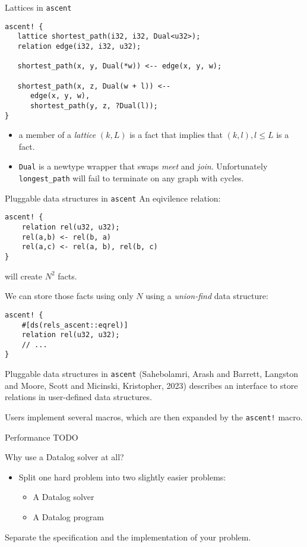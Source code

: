 \documentclass[presentation]{beamer}
\begin{document}
\begin{frame}[label={sec:orgaac534e},fragile]{Lattices in \texttt{ascent}}
 \begin{verbatim}
ascent! {
   lattice shortest_path(i32, i32, Dual<u32>);
   relation edge(i32, i32, u32);

   shortest_path(x, y, Dual(*w)) <-- edge(x, y, w);

   shortest_path(x, z, Dual(w + l)) <--
      edge(x, y, w),
      shortest_path(y, z, ?Dual(l));
}
\end{verbatim}

\begin{itemize}
\item a member of a \emph{lattice} \((k, L)\) is a fact that implies that \((k,l), l \leq L\) is a fact.
\item \texttt{Dual} is a newtype wrapper that swaps \emph{meet} and \emph{join}. Unfortunately \texttt{longest\_path} will fail to terminate on any graph with cycles.
\end{itemize}
\end{frame}
\begin{frame}[label={sec:org5fe676d},fragile]{Pluggable data structures in \texttt{ascent}}
 An eqivilence relation:
\begin{verbatim}
ascent! {
    relation rel(u32, u32);
    rel(a,b) <- rel(b, a)
    rel(a,c) <- rel(a, b), rel(b, c)
}
\end{verbatim}
will create \(N^2\) facts.

We can store those facts using only \(N\) using a \emph{union-find} data structure:
\begin{verbatim}
ascent! {
    #[ds(rels_ascent::eqrel)]
    relation rel(u32, u32);
    // ...
}
\end{verbatim}
\end{frame}
\begin{frame}[label={sec:org56b2971},fragile]{Pluggable data structures in \texttt{ascent}}
 (Sahebolamri, Arash and Barrett, Langston and Moore, Scott and Micinski, Kristopher, 2023) describes an interface to store relations in user-defined data structures.

Users implement several macros, which are then expanded by the \texttt{ascent!} macro.
\end{frame}
\begin{frame}[label={sec:org2e9837a}]{Performance}
TODO
\end{frame}
\begin{frame}[label={sec:org562d44d}]{Why use a Datalog solver at all?}
\begin{itemize}
\item Split one hard problem into two slightly easier problems:
\begin{itemize}
\item A Datalog solver
\item A Datalog program
\end{itemize}
\end{itemize}

Separate the specification and the implementation of your problem.
\end{frame}
\end{document}
